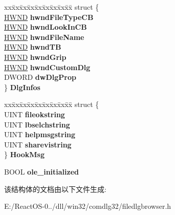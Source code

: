 \begin{DoxyCompactItemize}
\begin{tabbing}
\end{tabbing}\item 
\mbox{\label{struct_file_open_dlg_infos_aec0ef79ad6314c1829c38a06b13e538e}} 
\begin{tabbing}
xx\=xx\=xx\=xx\=xx\=xx\=xx\=xx\=xx\=\kill
struct \{\\
\>\hyperlink{interfacevoid}{HWND} {\bfseries hwndFileTypeCB}\\
\>\hyperlink{interfacevoid}{HWND} {\bfseries hwndLookInCB}\\
\>\hyperlink{interfacevoid}{HWND} {\bfseries hwndFileName}\\
\>\hyperlink{interfacevoid}{HWND} {\bfseries hwndTB}\\
\>\hyperlink{interfacevoid}{HWND} {\bfseries hwndGrip}\\
\>\hyperlink{interfacevoid}{HWND} {\bfseries hwndCustomDlg}\\
\>DWORD {\bfseries dwDlgProp}\\
\} {\bfseries DlgInfos}\\

\end{tabbing}\item 
\mbox{\label{struct_file_open_dlg_infos_a472b310620579733f3efeb516bf104ae}} 
\begin{tabbing}
xx\=xx\=xx\=xx\=xx\=xx\=xx\=xx\=xx\=\kill
struct \{\\
\>UINT {\bfseries fileokstring}\\
\>UINT {\bfseries lbselchstring}\\
\>UINT {\bfseries helpmsgstring}\\
\>UINT {\bfseries sharevistring}\\
\} {\bfseries HookMsg}\\

\end{tabbing}\item 
\mbox{\label{struct_file_open_dlg_infos_a6315c2bb9dc79680ef9b9e224d21c759}} 
B\+O\+OL {\bfseries ole\+\_\+initialized}
\end{DoxyCompactItemize}


该结构体的文档由以下文件生成\+:\begin{DoxyCompactItemize}
\item 
E\+:/\+React\+O\+S-\/0../dll/win32/comdlg32/filedlgbrowser.\+h\end{DoxyCompactItemize}
